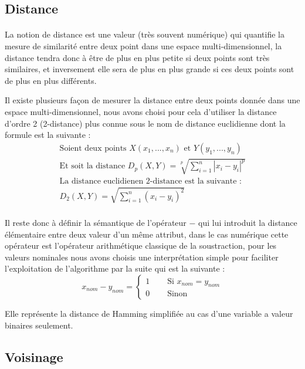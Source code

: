 		\subsection{Distance}\label{distance}
			\paragraph{}
			La notion de distance est une valeur (très souvent numérique) qui quantifie la mesure de similarité entre deux point dans une espace multi-dimensionnel, la distance tendra donc à être de plus en plus petite si deux points sont très similaires, et inversement elle sera de plus en plus grande si ces deux points sont de plus en plus différents.
			\par
			Il existe plusieurs façon de mesurer la distance entre deux points donnée dans une espace multi-dimensionnel, nous avons choisi pour cela d'utiliser la distance d'ordre 2 (2-distance) plus connue sous le nom de distance euclidienne dont la formule est la suivante : 
			\begin{gather*} 
				\text{Soient deux points } X(x_1,...,x_n) \text{ et } Y(y_1,...,y_n) \\
				\text{Et soit la distance }D_p(X,Y) = \sqrt[p]{\sum_{i=1}^{n} | x_i - y_i|^p} \\
				\text{La distance euclidienen 2-distance est la suivante : } \\
				D_2(X,Y) = \sqrt{\sum_{i=1}^{n} (x_i - y_i)^2} \\
			\end{gather*}
			\par\label{nomdist}
			Il reste donc à définir la sémantique de l'opérateur $-$ qui lui introduit la distance élémentaire entre deux valeur d'un même attribut, dans le cas numérique cette opérateur est l'opérateur arithmétique classique de la soustraction, pour les valeurs nominales nous avons choisis une interprétation simple pour faciliter l'exploitation de l'algorithme par la suite qui est la suivante : 
			\[ 
				x_{nom} - y_{nom} = 
				\begin{cases}
					1 & \quad\text{ Si } x_{nom} = y_{nom}\\
					0 & \quad\text{ Sinon }
				\end{cases}
			\] 
			\par Elle représente la distance de Hamming simplifiée au cas d'une variable a valeur binaires seulement.
		\subsection{Voisinage}\label{neighborhood}
